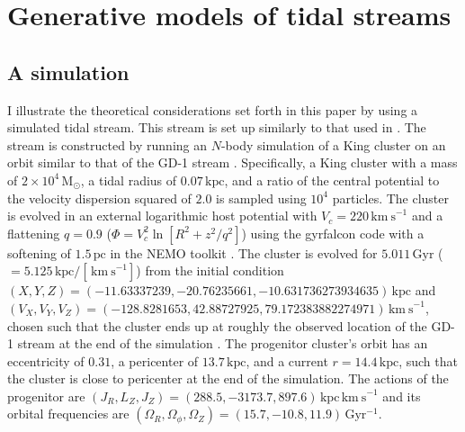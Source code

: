 \documentclass[12pt,preprint]{aastex}
\newcommand{\Gyr}{\ensuremath{\,\mathrm{Gyr}}}
\newcommand{\kpc}{\ensuremath{\,\mathrm{kpc}}}
\newcommand{\pc}{\ensuremath{\,\mathrm{pc}}}
\newcommand{\kms}{\ensuremath{\,\mathrm{km\ s}^{-1}}}
\newcommand{\msun}{\ensuremath{\,\mathrm{M}_{\odot}}}
\newcommand{\inv}{\ensuremath{^{-1}}}
\begin{document}
\section{Generative models of tidal streams}\label{sec:generative}

\subsection{A simulation}\label{sec:sim}

I illustrate the theoretical considerations set forth in this paper by
using a simulated tidal stream. This stream is set up similarly to
that used in \citet{Sanders13b}. The stream is constructed by running
an $N$-body simulation of a King cluster on an orbit similar to that
of the GD-1 stream \citep{Koposov10a}. Specifically, a King cluster
with a mass of $2\times10^4\msun$, a tidal radius of $0.07\kpc$, and a
ratio of the central potential to the velocity dispersion squared of
$2.0$ is sampled using $10^4$ particles. The cluster is evolved in an
external logarithmic host potential with $V_c = 220\kms$ and a
flattening $q=0.9$ ($\Phi = V_c^2 \ln [R^2 + z^2/q^2]$) using the
gyrfalcon code \citep{Dehnen00a,Dehnen02a} with a softening of
$1.5\pc$ in the NEMO toolkit \citep{Teuben95a}. The cluster is evolved
for $5.011\Gyr$ ($=5.125\kpc/[\kms]$) from the initial condition
$(X,Y,Z) = (-11.63337239,-20.76235661,-10.631736273934635)\kpc$ and
$(V_X,V_Y,V_Z) = (-128.8281653,42.88727925,79.172383882274971)\kms$,
chosen such that the cluster ends up at roughly the observed location
of the GD-1 stream at the end of the simulation
\citep{Koposov10a}. The progenitor cluster's orbit has an eccentricity
of $0.31$, a pericenter of $13.7\kpc$, and a current $r=14.4\kpc$,
such that the cluster is close to pericenter at the end of the
simulation. The actions of the progenitor are $(J_R,L_Z,J_Z) =
(288.5,-3173.7,897.6)\kpc\kms$ and its orbital frequencies are
$(\Omega_R,\Omega_\phi,\Omega_Z) = (15.7,-10.8,11.9)\Gyr\inv$.
\end{document}
